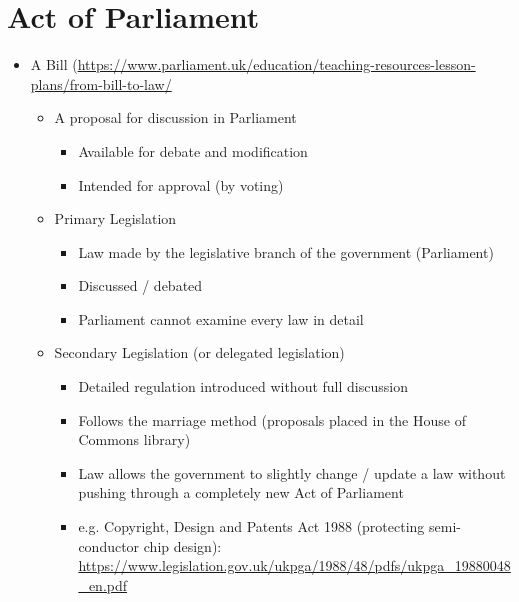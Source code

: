 \documentclass{article}
\begin{document}
\section{Act of Parliament}
\begin{itemize}
\item A Bill (\url{https://www.parliament.uk/education/teaching-resources-lesson-plans/from-bill-to-law/}
\begin{itemize}
\item A proposal for discussion in Parliament 
\begin{itemize}
\item Available for debate and modification
\item Intended for approval (by voting)
\end{itemize}
\item Primary Legislation
\begin{itemize}
\item Law made by the legislative branch of the government (Parliament)
\item Discussed / debated
\item Parliament cannot examine every law in detail
\end{itemize}
\item Secondary Legislation (or delegated legislation)
\begin{itemize}
\item Detailed regulation introduced without full discussion
\item Follows the marriage method (proposals placed in the House of Commons library)
\item Law allows the government to slightly change / update a law without pushing through a completely new Act of Parliament
\item e.g. Copyright, Design and Patents Act 1988 (protecting semi-conductor chip design): \url{https://www.legislation.gov.uk/ukpga/1988/48/pdfs/ukpga_19880048_en.pdf}
\end{itemize}
\end{itemize}
\end{itemize}
\end{document}
